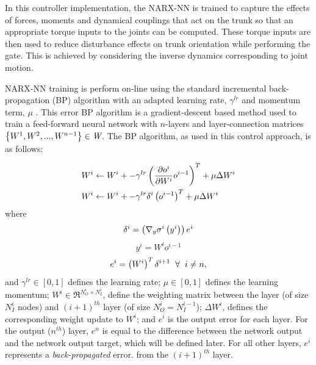 		In this controller implementation, the NARX-NN is trained to capture the effects of forces, moments and dynamical couplings that act on the trunk so that an appropriate torque inputs to the joints can be computed. These torque inputs are then used to reduce disturbance effects on trunk orientation while performing the gate. This is achieved by considering the inverse dynamics corresponding to joint motion.

		NARX-NN training is perform on-line using the standard incremental back-propagation (BP) algorithm with an adapted learning rate, $\gamma^{lr}$ and momentum term, $\mu$ \cite{Rumelhart1988,Rumelhart1995}. This error BP algorithm \cite{Rojas1996ch7} is a gradient-descent based method used to train a feed-forward neural network with $n$-layers and layer-connection matrices $\left\{W^{1},W^{2},...,W^{n-1}\right\} \in \emph{W}$. The BP algorithm, as used in this control approach, is as follows: 

			\begin{equation}
				\begin{split}
					W^{i} &\leftarrow W^{i} + 
						-\gamma^{lr} \left( \frac{ \partial o^{i} }{\partial {W^{i} } }  o^{i-1} \right)^{T}  + \mu \Delta W^{i} \\
					W^{i} &\leftarrow W^{i} + 
						-\gamma^{lr} \delta^{i} \left(o^{i-1}\right)^{T}  + \mu \Delta W^{i}
				\end{split}
				\label{eq::bp_weight_update}
			\end{equation} 
		where
			\begin{equation*}
				\delta^{i} = \left( \nabla_{y} \sigma^{i}\left(y^{i}\right) \right) e^{i}
				\label{eq::bp_error}
			\end{equation*}
			\begin{equation*}
				y^{i} = W^{i} o^{i-1}
				\label{eq::bp_error}
			\end{equation*}
			\begin{equation*}
				e^{i} =  \left( W^{i} \right)^{T} \delta^{i+1} \hspace{2mm} \forall \hspace{2mm} i\neq n,
			\end{equation*}
		and $\gamma^{lr} \in [0,1]$ defines the learning rate;  $\mu \in [0,1]$ defines the learning momentum; $W^{i} \in \Re^{N_{O}^{i}\times N_{I}^{i}}$, define the weighting matrix between the \Ith layer (of size $N_{I}^{i}$ nodes) and $(i+1)^{th}$ layer (of size $N_{O}^{i}=N_{I}^{i-1}$); $\Delta W^{i}$, defines the corresponding weight update to $W^{i}$; and $e^{i}$ is the output error for each \Ith layer. For the output ($n^{th}$) layer, $e^{n}$ is equal to the difference between the network output and the network output target, which will be defined later. For all other layers, $e^{i}$ represents a \emph{back-propagated} error. from the $(i+1)^{th}$ layer.


